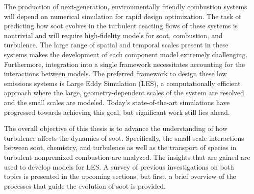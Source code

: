 The production of next-generation, environmentally friendly combustion systems will depend on numerical simulation for rapid design optimization. The task of predicting how soot evolves in the turbulent reacting flows of these systems is nontrivial and will require high-fidelity models for soot, combustion, and turbulence. The large range of spatial and temporal scales present in these systems makes the development of each component model extremely challenging. Furthermore, integration into a single framework necessitates accounting for the interactions between models. The preferred framework to design these low emissions systems is Large Eddy Simulation (LES), a computationally efficient approach where the large, geometry-dependent scales of the system are resolved and the small scales are modeled. Today's state-of-the-art simulations have progressed towards achieving this goal, but significant work still lies ahead.

The overall objective of this thesis is to advance the understanding of how turbulence affects the dynamics of soot. Specifically, the small-scale interactions between soot, chemistry, and turbulence as well as the transport of species in turbulent nonpremixed combustion are analyzed. The insights that are gained are used to develop models for LES. A survey of previous investigations on both topics is presented in the upcoming sections, but first, a brief overview of the processes that guide the evolution of soot is provided.





